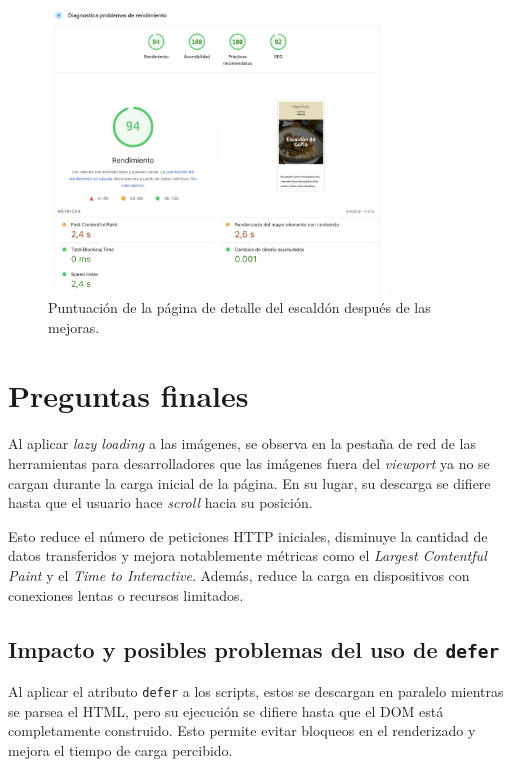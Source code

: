 \documentclass{article}
\begin{document}
\begin{figure}[h!]
    \centering
    \includegraphics[width=0.8\textwidth]{./img/p3/escaldon-performance-after}
    \caption{Puntuación de la página de detalle del escaldón después de las mejoras.}
    \label{fig:escaldon-performance-after}
\end{figure}

\section{Preguntas finales}\label{sec:preguntas-finales}

Al aplicar \textit{lazy loading} a las imágenes, se observa en la pestaña de red de las herramientas para desarrolladores que las imágenes fuera del \textit{viewport} ya no se cargan durante la carga inicial de la página. En su lugar, su descarga se difiere hasta que el usuario hace \textit{scroll} hacia su posición.

Esto reduce el número de peticiones HTTP iniciales, disminuye la cantidad de datos transferidos y mejora notablemente métricas como el \textit{Largest Contentful Paint} y el \textit{Time to Interactive}. Además, reduce la carga en dispositivos con conexiones lentas o recursos limitados.

\subsection{Impacto y posibles problemas del uso de \texttt{defer}}\label{subsec:impacto-y-problemas-de-defer}

Al aplicar el atributo \texttt{defer} a los scripts, estos se descargan en paralelo mientras se parsea el HTML, pero su ejecución se difiere hasta que el DOM está completamente construido. Esto permite evitar bloqueos en el renderizado y mejora el tiempo de carga percibido.
\end{document}
